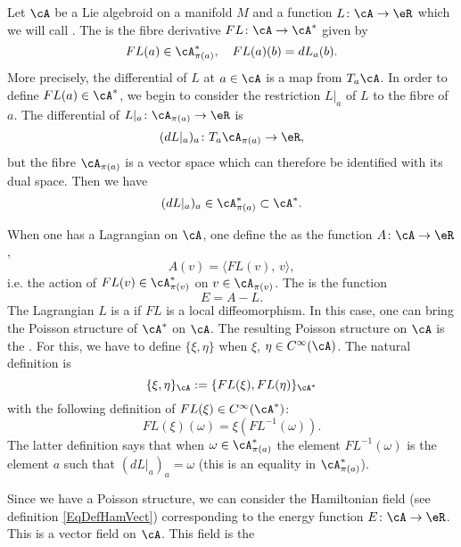 Let $\cA$ be a Lie algebroid on a manifold $M$ and a function $L\colon \cA\to \eR$ which we will call . The  is the fibre derivative $FL\colon \cA\to \cA^*$ given by
\begin{equation}
FL(a)\in\cA^*_{\pi(a)},\quad FL(a)(b)=dL_{a}(b).
\end{equation}
More precisely, the differential of $L$ at $a\in \cA$ is a map from $T_{a}\cA$. In order to define $FL(a)\in\cA^*$, we begin to consider the restriction $L|_{a}$ of $L$ to the fibre of $a$. The differential of $L|_{a}\colon \cA_{\pi(a)}\to \eR$ is
\[ 
  (dL|_{a})_{a}\colon T_{a}\cA_{\pi(a)}\to \eR,
\]
 but the fibre $\cA_{\pi(a)}$ is a vector space which can therefore be identified with its dual space. Then we have
\[ 
  (dL|_{a})_{a}\in\cA^*_{\pi(a)}\subset\cA^*.
\]

When one has a Lagrangian on $\cA$, one define the  as the function $A\colon \cA\to \eR$,
\begin{equation}
   A(v)=\langle FL(v),\,v\rangle,
\end{equation}
i.e. the action of $FL(v)\in\cA^*_{\pi(v)}$ on $v\in\cA_{\pi(v)}$. The  is the function
\[ 
  E=A-L.
\]
The Lagrangian $L$ is a  if $FL$ is a local diffeomorphism. In this case, one can bring the Poisson structure of $\cA^*$ on $\cA$. The resulting Poisson structure on $\cA$ is the . For this, we have to define $\{ \xi,\eta \}$ when $\xi$, $\eta\in C^{\infty}(\cA)$. The natural definition is
\begin{equation}
\{ \xi,\eta \}_{\cA}:=\{ FL(\xi),FL(\eta) \}_{\cA^*}
\end{equation}
with the following definition of $FL(\xi)\in  C^{\infty}(\cA^*)$:
\begin{equation}
FL(\xi)(\omega)=\xi(FL^{-1}(\omega)).
\end{equation}
The latter definition says that when $\omega\in\cA^*_{\pi(a)}$ the element $FL^{-1}(\omega)$ is the element $a$ such that $(dL|_{a})_{a}=\omega$ (this is an equality in $\cA^*_{\pi(a)}$).

Since we have a Poisson structure, we can consider the Hamiltonian field (see definition \eqref{EqDefHamVect}) corresponding to the energy function $E\colon \cA\to \eR$. This is a vector field on $\cA$. This field is the 

